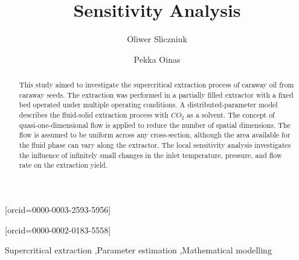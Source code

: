 \documentclass[a4paper,fleqn]{cas-dc}
\begin{document}
 

\title[mode=title]{Sensitivity Analysis}                      


\author[1]{Oliwer Sliczniuk}[orcid=0000-0003-2593-5956]
\cormark[1]

\author[1]{Pekka Oinas}[orcid=0000-0002-0183-5558]


\address[1]{Aalto University, School of Chemical Engineering, Espoo, 02150, Finland}


\begin{abstract}
This study aimed to investigate the supercritical extraction process of caraway oil from caraway seeds. The extraction was performed in a partially filled extractor with a fixed bed operated under multiple operating conditions. A distributed-parameter model describes the fluid-solid extraction process with $CO_2$ as a solvent. The concept of quasi-one-dimensional flow is applied to reduce the number of spatial dimensions. The flow is assumed to be uniform across any cross-section, although the area available for the fluid phase can vary along the extractor. The local sensitivity analysis investigates the influence of infinitely small changes in the inlet temperature, pressure, and flow rate on the extraction yield. 

\end{abstract}

\begin{keywords}
Supercritical extraction \sep Parameter estimation \sep Mathematical modelling
\end{keywords}

\maketitle
\end{document}
